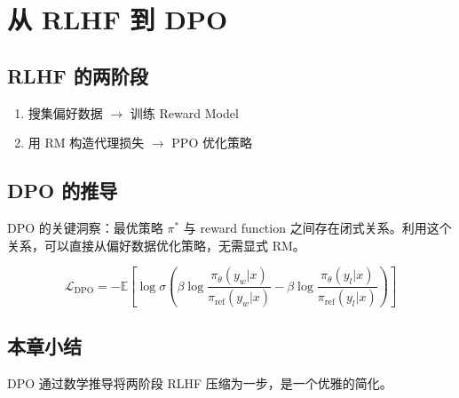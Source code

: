 \section{从 RLHF 到 DPO}
\subsection{RLHF 的两阶段}
\begin{enumerate}
  \item 搜集偏好数据 $\to$ 训练 Reward Model
  \item 用 RM 构造代理损失 $\to$ PPO 优化策略
\end{enumerate}

\subsection{DPO 的推导}
DPO 的关键洞察：最优策略 $\pi^*$ 与 reward function 之间存在闭式关系。利用这个关系，可以直接从偏好数据优化策略，无需显式 RM。

$$\mathcal{L}_{\text{DPO}} = -\mathbb{E}\left[\log \sigma\left(\beta \log \frac{\pi_\theta(y_w|x)}{\pi_{\text{ref}}(y_w|x)} - \beta \log \frac{\pi_\theta(y_l|x)}{\pi_{\text{ref}}(y_l|x)}\right)\right]$$

\subsection{本章小结}
DPO 通过数学推导将两阶段 RLHF 压缩为一步，是一个优雅的简化。

\newpage
